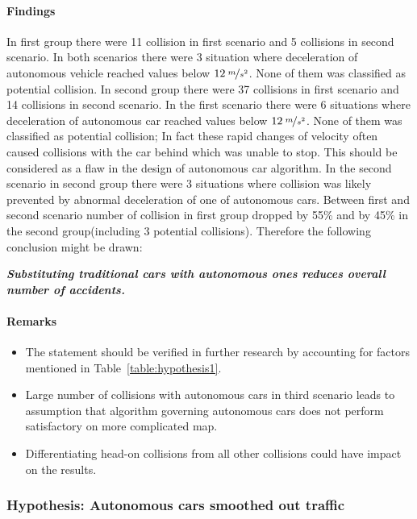 \documentclass[11pt,english]{article}
\begin{document}
\paragraph{Findings}

In first group there were 11 collision in first scenario and 5 collisions in second scenario. In both scenarios there were 3 situation where deceleration of autonomous vehicle reached values below $12\:\nicefrac{m}{s^2}$. None of them was classified as potential collision. 
In second group there were 37 collisions in first scenario and 14 collisions in second scenario. In the first scenario there were 6 situations where deceleration of autonomous car reached values below $12\:\nicefrac{m}{s^2}$. None of them was classified as potential collision; In fact these rapid changes of velocity often caused collisions with the car behind which was unable to stop. This should be considered as a flaw in the design of autonomous car algorithm. In the second scenario in second group there were 3 situations where collision was likely prevented by abnormal deceleration of one of autonomous cars. Between first and second scenario number of collision in first group dropped by 55\% and by 45\% in the second group(including 3 potential collisions). Therefore the following conclusion might be drawn:

\textbf{\textit{Substituting traditional cars with autonomous ones reduces overall number of accidents.}}



\paragraph{Remarks}

\begin{itemize}
  \item The statement should be verified in further research by accounting for factors mentioned in Table~\ref{table:hypothesis1}.
  \item Large number of collisions with autonomous cars in third scenario leads to assumption that algorithm governing autonomous cars does not perform satisfactory on more complicated map. 
  \item Differentiating head-on collisions from all other collisions could have impact on the results.
\end{itemize}




\subsubsection{Hypothesis: Autonomous cars smoothed out traffic}
\end{document}
